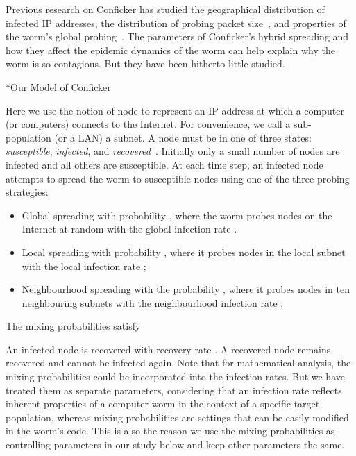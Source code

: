 \documentclass[9pt]{article}
\makeatletter
\renewcommand{\section}{\@startsection {section}{1}{0pt}{-6pt}{1pt}{\reset@font \large \bfseries}}
\makeatother
\begin{document}
Previous research on Conficker has studied the geographical distribution of infected IP addresses, the distribution of probing packet size~\cite{Shin_2012, Irwin_2012, Chiba_2013},  
and properties of the worm's global probing~\cite{Li_2009, Yao_2011}. 
The parameters of Conficker's hybrid spreading and how they affect the
epidemic dynamics of the worm can help explain why the worm is so contagious. But they have been hitherto little studied. 



\section*{Our Model of Conficker}

Here we use the notion of node to represent an IP address at which a computer (or computers) connects to the Internet.
For convenience, we call a sub-population (or a LAN) a subnet. 
A node must be in one of three states: {\em susceptible}, {\em infected}, and {\em recovered}~\cite{Newman_Book_2010}.
Initially only a small number of nodes are infected and all others are susceptible.
At each time step, an infected node attempts to spread the worm to susceptible nodes using one of the three probing strategies:
\begin{itemize} 
\item Global spreading with probability , where the worm probes nodes on the Internet at random with the global infection rate .
\item Local spreading with probability , where it  probes nodes in the local subnet with the local infection rate ; 
\item Neighbourhood spreading with the probability , where it probes nodes in ten neighbouring subnets with the neighbourhood infection rate ; 
\end{itemize}
The mixing probabilities satisfy



An infected node is recovered with recovery rate . 
A recovered node remains recovered and cannot be infected again. 
Note that for mathematical analysis, the mixing probabilities could be incorporated into the infection rates. But we have treated them as separate parameters, considering that an infection rate reflects inherent properties of a computer worm in the context of a specific target population, whereas mixing probabilities are settings that can be easily modified in the worm's code. 
This is also the reason we use the mixing probabilities as controlling parameters in our study below and keep other parameters the same. 
\end{document}
